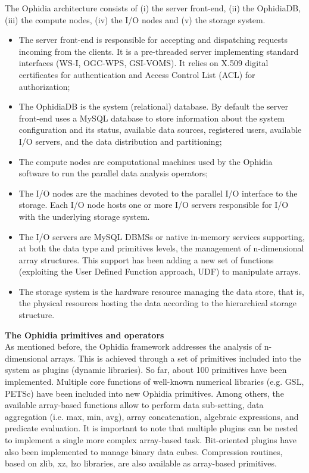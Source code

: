 The Ophidia architecture consists of (i) the server front-end, (ii) the OphidiaDB, (iii) the compute nodes, (iv) the I/O nodes and (v) the storage system.
\begin{itemize}
	\item The server front-end is responsible for accepting and dispatching requests incoming from the clients. It is a pre-threaded server implementing standard interfaces (WS-I, OGC-WPS, GSI-VOMS). It relies on X.509 digital certificates for authentication and Access Control List (ACL) for authorization;
	\item The OphidiaDB is the system (relational) database. By default the server front-end uses a MySQL database to store information about the system configuration and its status, available data sources, registered users, available I/O servers, and the data distribution and partitioning;
	\item The compute nodes are computational machines used by the Ophidia software to run the parallel data analysis operators;
	\item The I/O nodes are the machines devoted to the parallel I/O interface to the storage. Each I/O node hosts one or more I/O servers responsible for I/O with the underlying storage system. %
	\item The I/O servers are MySQL DBMSs or native in-memory services \cite{DBLP:conf/cd/EliaFDPFW16} supporting, at both the data type and primitives levels, the management of n-dimensional array structures. This support has been adding a new set of functions (exploiting the User Defined Function approach, UDF) to manipulate arrays.
	\item The storage system is the hardware resource managing the data store, that is, the physical resources hosting the data according to the hierarchical storage structure. %
\end{itemize}

\textbf{The Ophidia primitives and operators}\\

As mentioned before, the Ophidia framework addresses the analysis of n-dimensional arrays. This is achieved through a set of primitives included into the system as plugins (dynamic libraries). So far, about 100 primitives have been implemented. Multiple core functions of well-known numerical libraries (e.g. GSL, PETSc) have been included into new Ophidia primitives. Among others, the available array-based functions allow to perform data sub-setting, data aggregation (i.e. max, min, avg), array concatenation, algebraic expressions, and predicate evaluation. It is important to note that multiple plugins can be nested to implement a single more complex array-based task.
Bit-oriented plugins have also been implemented to manage binary data cubes. Compression routines, based on zlib, xz, lzo libraries, are also available as array-based primitives.\\

